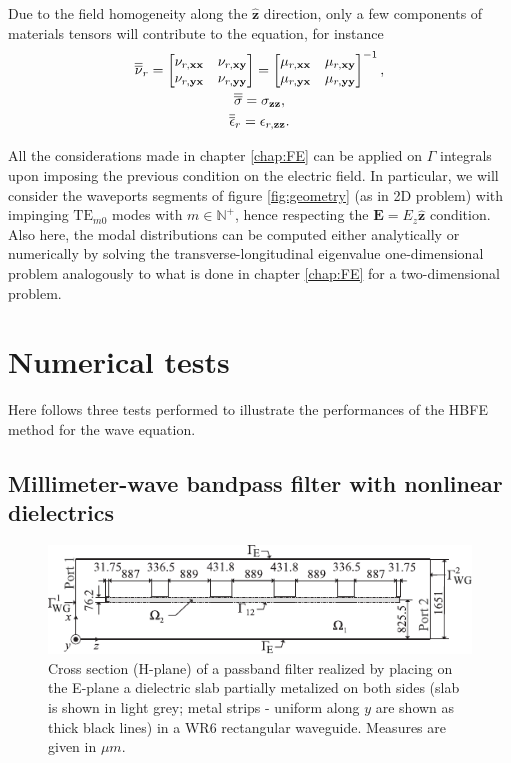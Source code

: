 Due to the field homogeneity along the $\hat{\mathbf{z}}$ direction, only a few components of materials tensors will contribute to the equation, for instance
\begin{gather}
\overline{\overline{\nu}}_r = 
\begin{bmatrix}
\nu_{r,\mathbf{x}\mathbf{x}} & \nu_{r,\mathbf{x}\mathbf{y}}\\
\nu_{r,\mathbf{y}\mathbf{x}} & \nu_{r,\mathbf{y}\mathbf{y}}
\end{bmatrix} = \begin{bmatrix}
\mu_{r,\mathbf{x}\mathbf{x}} & \mu_{r,\mathbf{x}\mathbf{y}}\\
\mu_{r,\mathbf{y}\mathbf{x}} & \mu_{r,\mathbf{y}\mathbf{y}}
\end{bmatrix}^{-1},\\
\overline{\overline{\sigma}} = \sigma_{\mathbf{z}\mathbf{z}},\\
\overline{\overline{\epsilon}}_r = \epsilon_{r,\mathbf{z}\mathbf{z}}.
\end{gather}

All the considerations made in chapter \ref{chap:FE} can be applied on $\Gamma$ integrals upon imposing the previous condition on the electric field. In particular, we will consider the waveports segments of figure \ref{fig:geometry} (as in 2D problem) with impinging $\mathrm{TE}_{m0}$ modes with $m \in \mathbb{N}^+$, hence respecting the $\mathbf{E} = E_z \hat{\mathbf{z}}$ condition. Also here, the modal distributions can be computed either analytically \cite{pelosi2009quick} or numerically by solving the transverse-longitudinal eigenvalue one-dimensional problem analogously to what is done in chapter \ref{chap:FE} for a two-dimensional problem.

\section{Numerical tests}

Here follows three tests performed to illustrate the performances of the HBFE method for the wave equation.

\subsection{Millimeter-wave bandpass filter with nonlinear dielectrics}

\begin{figure}[ht!]
\centering
\includegraphics[width=13.4cm]{bilat}
\caption{Cross section (H-plane) of a passband filter realized
by placing on the E-plane a dielectric slab partially metalized on both sides
(slab is shown in light grey; metal strips - uniform along $y$ are shown as
thick black lines) in a WR6 rectangular waveguide. Measures are given in $\mu{m}$.}
\label{fig:bilat}
\end{figure}

